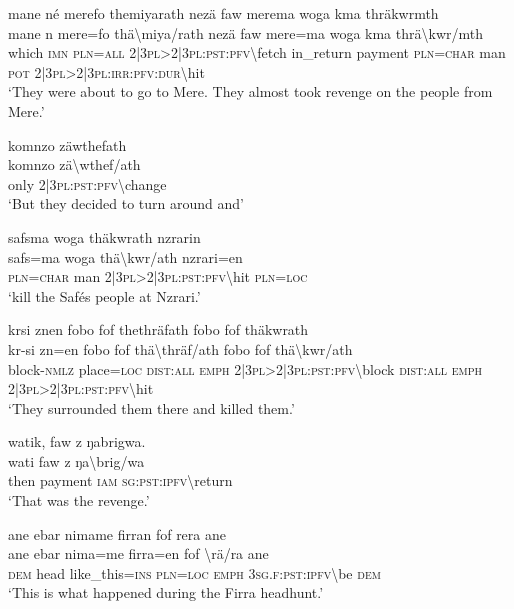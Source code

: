 \newpage
\ea\label{ex:4:a6699}
mane né merefo themiyarath nezä faw merema woga kma thräkwrmth\\
\gll mane	n	mere=fo	thä{\textbackslash}miya/rath	nezä	faw	mere=ma	woga	kma	thrä{\textbackslash}kwr/mth\\
     which	\textsc{imn}	\textsc{pln}=\textsc{all}	2|3\textsc{pl}>2|3\textsc{pl}:\textsc{pst}:\textsc{pfv}{\textbackslash}fetch	in\_return	payment	\textsc{pln}=\textsc{char}	man	\textsc{pot}	2|3\textsc{pl}>2|3\textsc{pl}:\textsc{irr}:\textsc{pfv}:\textsc{dur}{\textbackslash}hit\\
\glt `They were about to go to Mere. They almost took revenge on the people from Mere.'
\z

\ea\label{ex:4:a1770}
komnzo zäwthefath\\
\gll komnzo	zä{\textbackslash}wthef/ath\\
     only	2|3\textsc{pl}:\textsc{pst}:\textsc{pfv}{\textbackslash}change\\
\glt `But they decided to turn around and'
\z

\ea\label{ex:4:a1771}
safsma woga thäkwrath nzrarin\\
\gll safs=ma	woga	thä{\textbackslash}kwr/ath	nzrari=en\\
     \textsc{pln}=\textsc{char}	man	2|3\textsc{pl}>2|3\textsc{pl}:\textsc{pst}:\textsc{pfv}{\textbackslash}hit	\textsc{pln}=\textsc{loc}\\
\glt `kill the Safés people at Nzrari.'
\z

\ea\label{ex:4:a1772}
krsi znen fobo fof thethräfath fobo fof thäkwrath\\
\gll kr-si	zn=en	fobo	fof	thä{\textbackslash}thräf/ath	fobo	fof	thä{\textbackslash}kwr/ath\\
     block-\textsc{nmlz}	place=\textsc{loc}	\textsc{dist}:\textsc{all}	\textsc{emph}	2|3\textsc{pl}>2|3\textsc{pl}:\textsc{pst}:\textsc{pfv}{\textbackslash}block	\textsc{dist}:\textsc{all}	\textsc{emph}	2|3\textsc{pl}>2|3\textsc{pl}:\textsc{pst}:\textsc{pfv}{\textbackslash}hit\\
\glt `They surrounded them there and killed them.'
\z

\ea\label{ex:4:a1773}
watik, faw z ŋabrigwa.\\
\gll wati	faw	z	ŋa{\textbackslash}brig/wa\\
     then	payment	\textsc{iam}	\textsc{sg}:\textsc{pst}:\textsc{ipfv}{\textbackslash}return\\
\glt `That was the revenge.'
\z

\ea\label{ex:4:a1774}
ane ebar nimame firran fof rera ane\\
\gll ane	ebar	nima=me	firra=en	fof	{\textbackslash}rä/ra	ane\\
     \textsc{dem}	head	like\_this=\textsc{ins}	\textsc{pln}=\textsc{loc}	\textsc{emph}	3\textsc{sg}.\textsc{f}:\textsc{pst}:\textsc{ipfv}{\textbackslash}be	\textsc{dem}\\
\glt `This is what happened during the Firra headhunt.'
\z

